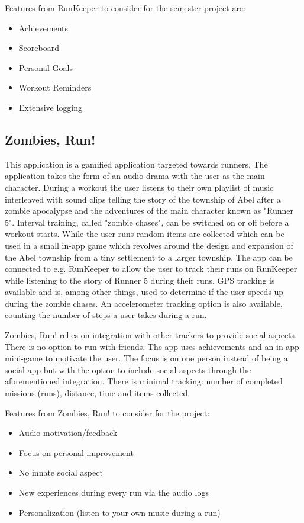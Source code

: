 Features from RunKeeper to consider for the semester project are:
\begin{itemize}
\item Achievements
\item Scoreboard
\item Personal Goals
\item Workout Reminders
\item Extensive logging
\end{itemize}

\subsection{Zombies, Run!}
This application is a gamified application targeted towards runners. The application takes the form of an audio drama with the user as the main character. During a workout the user listens to their own playlist of music interleaved with sound clips telling the story of the township of Abel after a zombie apocalypse and the adventures of the main character known as "Runner 5". Interval training, called "zombie chases", can be switched on or off before a workout starts. While the user runs random items are collected which can be used in a small in-app game which revolves around the design and expansion of the Abel township from a tiny settlement to a larger township. The app can be connected to e.g. RunKeeper to allow the user to track their runs on RunKeeper while listening to the story of Runner 5 during their runs. \ac{GPS} tracking is available and is, among other things, used to determine if the user speeds up during the zombie chases. An accelerometer tracking option is also available, counting the number of steps a user takes during a run.
\vspace{10pt}

Zombies, Run! relies on integration with other trackers to provide social aspects. There is no option to run with friends. The app uses achievements and an in-app mini-game to motivate the user. The focus is on one person instead of being a social app but with the option to include social aspects through the aforementioned integration. There is minimal tracking: number of completed missions (runs), distance, time and items collected.
\vspace{10pt}

Features from Zombies, Run! to consider for the project:
\begin{itemize}
\item Audio motivation/feedback
\item Focus on personal improvement
\item No innate social aspect
\item New experiences during every run via the audio logs
\item Personalization (listen to your own music during a run)
\end{itemize}